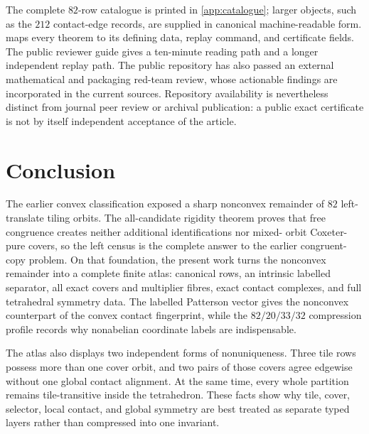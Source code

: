 The complete $82$-row catalogue is printed in \cref{app:catalogue}; larger
objects, such as the $212$ contact-edge records, are supplied in canonical
machine-readable form.   maps every theorem
to its defining data, replay command, and certificate fields.  The public
reviewer guide gives a ten-minute reading path and a longer independent replay
path.  The public repository has also passed an external mathematical and
packaging red-team review, whose actionable findings are incorporated in the
current sources.  Repository availability is nevertheless distinct from
journal peer review or archival publication: a public exact certificate is
not by itself independent acceptance of the article.

\section{Conclusion}\label{sec:conclusion}

The earlier convex classification exposed a sharp nonconvex remainder of
$82$ left-translate tiling orbits.  The all-candidate rigidity theorem proves
that free congruence creates neither additional identifications nor mixed-
orbit Coxeter-pure covers, so the left census is the complete answer to the
earlier congruent-copy problem.  On that foundation, the present work turns
the nonconvex remainder into a complete finite atlas: canonical rows, an
intrinsic labelled separator, all exact covers and multiplier fibres, exact
contact complexes, and full tetrahedral symmetry data.  The labelled
Patterson vector gives the nonconvex counterpart of the convex contact
fingerprint, while the $82/20/33/32$ compression profile records why
nonabelian coordinate labels are indispensable.

The atlas also displays two independent forms of nonuniqueness.  Three tile
rows possess more than one cover orbit, and two pairs of those covers agree
edgewise without one global contact alignment.  At the same time, every
whole partition remains tile-transitive inside the tetrahedron.  These facts
show why tile, cover, selector, local contact, and global symmetry are best
treated as separate typed layers rather than compressed into one invariant.
